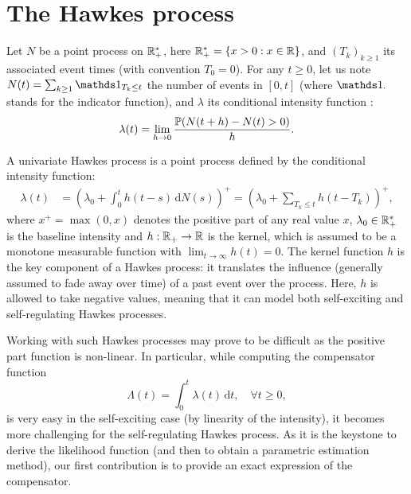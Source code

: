 \section{The Hawkes process}\label{sec:chap1_general}

Let $N$ be a point process on ${\mathbb R}_+^*$, here \({\mathbb R}_+^* = \left\{ x>0 : x \in {\mathbb R} \right\}\), and $(T_k)_{k\geq 1}$ its associated event times (with convention $T_0 = 0$).
For any $t \geq 0$, let us note $N(t) = \sum_{k\geq 1}{\II_{T_k \leq t }}$ the number of events in $[0,t]$
(where \(\II_{\cdot}\) stands for the indicator function),
and $\lambda$ its conditional intensity function \parencite{DaleyV1}:
\begin{equation*}
    \lambda(t) = \lim_{h\to 0}{\frac{{\mathbb P}(N(t+h) - N(t) > 0)}{h}}.
\end{equation*}

A univariate Hawkes process is a point process defined by the conditional intensity function:
\begin{align}
    \lambda(t) &= \left(\lambda_0 + \int_{0}^{t}{h(t-s)\,\mathrm{d}N(s)}\right)^+
    = \left(\lambda_0 + \sum_{T_k \leq t}{h(t-T_k)}\right)^+,
    \label{eq:chap1_general_hawkes}
\end{align}
where $x^+ = \max(0,x)$ denotes the positive part of any real value $x$,
$\lambda_0\in{\mathbb R}_+^*$ is the baseline intensity and
\(h : {\mathbb R}_+ \to {\mathbb R}\) is the kernel, which is assumed to be a monotone measurable function with $\lim_{t\to\infty} h(t) = 0$.
The kernel function $h$ is the key component of a Hawkes process:
it translates the influence (generally assumed to fade away over time) of a past event over the process.
Here, $h$ is allowed to take negative values, meaning that it can model both self-exciting and self-regulating Hawkes processes.

Working with such Hawkes processes may prove to be difficult as the positive part function is non-linear.
In particular, while computing the compensator function \parencite{DaleyV1}
\begin{equation}
    \Lambda(t) = \int_{0}^{t}{\lambda(t)\,\mathrm{d}t},
    \quad \forall t \geq 0,
    \label{eq:chap1_compensator}
\end{equation}
is very easy in the self-exciting case (by linearity of the intensity), it becomes more challenging for the self-regulating Hawkes process.
As it is the keystone to derive the likelihood function (and then to obtain a parametric estimation method), our first contribution is to provide an exact expression of the compensator.

